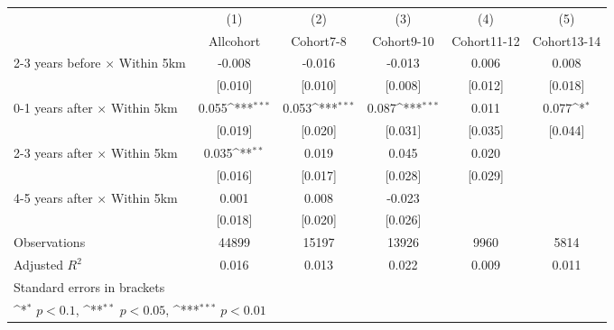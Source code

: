 {
\def\sym#1{\ifmmode^{#1}\else\(^{#1}\)\fi}
\begin{tabular}{l*{5}{c}}
\hline\hline
                    &\multicolumn{1}{c}{(1)}&\multicolumn{1}{c}{(2)}&\multicolumn{1}{c}{(3)}&\multicolumn{1}{c}{(4)}&\multicolumn{1}{c}{(5)}\\
                    &\multicolumn{1}{c}{Allcohort}&\multicolumn{1}{c}{Cohort7-8}&\multicolumn{1}{c}{Cohort9-10}&\multicolumn{1}{c}{Cohort11-12}&\multicolumn{1}{c}{Cohort13-14}\\
\hline
2-3 years before $\times$ Within 5km&      -0.008         &      -0.016         &      -0.013         &       0.006         &       0.008         \\
                    &     [0.010]         &     [0.010]         &     [0.008]         &     [0.012]         &     [0.018]         \\
0-1 years after $\times$ Within 5km&       0.055\sym{***}&       0.053\sym{***}&       0.087\sym{***}&       0.011         &       0.077\sym{*}  \\
                    &     [0.019]         &     [0.020]         &     [0.031]         &     [0.035]         &     [0.044]         \\
2-3 years after $\times$ Within 5km&       0.035\sym{**} &       0.019         &       0.045         &       0.020         &                     \\
                    &     [0.016]         &     [0.017]         &     [0.028]         &     [0.029]         &                     \\
4-5 years after $\times$ Within 5km&       0.001         &       0.008         &      -0.023         &                     &                     \\
                    &     [0.018]         &     [0.020]         &     [0.026]         &                     &                     \\
\hline
Observations        &       44899         &       15197         &       13926         &        9960         &        5814         \\
Adjusted \(R^{2}\)  &       0.016         &       0.013         &       0.022         &       0.009         &       0.011         \\
\hline\hline
\multicolumn{6}{l}{\footnotesize Standard errors in brackets}\\
\multicolumn{6}{l}{\footnotesize \sym{*} \(p<0.1\), \sym{**} \(p<0.05\), \sym{***} \(p<0.01\)}\\
\end{tabular}
}
